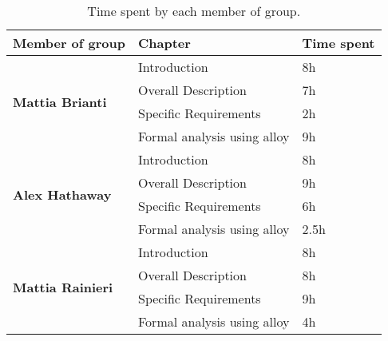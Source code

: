 \begin{table}[H]
      \centering
      \begin{tabular}{|l|l|l|}
            \hline
            \textbf{Member of group }                  & \textbf{Chapter}            & \textbf{Time spent} \\\hline
            \multirow{4}{*}{\textbf{Mattia Brianti}} & Introduction                & 8h                  \\
                                                       & Overall Description         & 7h                \\
                                                       & Specific Requirements       & 2h                 \\
                                                       & Formal analysis using alloy & 9h                 \\\hline
            \multirow{4}{*}{\textbf{Alex Hathaway}} & Introduction                & 8h                  \\
                                                       & Overall Description         & 9h                  \\
                                                       & Specific Requirements       & 6h                  \\
                                                       & Formal analysis using alloy & 2.5h                  \\\hline
            \multirow{4}{*}{\textbf{Mattia Rainieri}} & Introduction                & 8h                  \\
                                                       & Overall Description         & 8h                 \\
                                                       & Specific Requirements       & 9h                  \\
                                                       & Formal analysis using alloy & 4h                \\\hline
      \end{tabular}
      \caption{Time spent by each member of group.}
      \label{table:Time spent}
\end{table}

